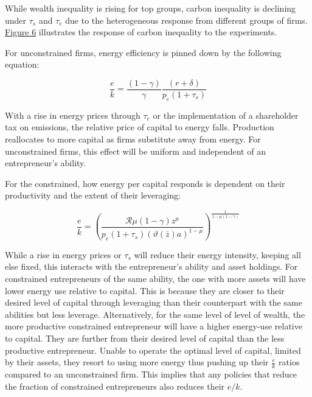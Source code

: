 \documentclass[12pt,a4paper]{article}
\begin{document}
\hspace*{6mm} While wealth inequality is rising for top groups, carbon inequality is declining under $\tau_s$ and $\tau_e$ due to the heterogeneous response from different groups of firms. \hyperref[fig:carboninequality]{Figure 6} illustrates the response of carbon inequality to the experiments. 

For unconstrained firms, energy efficiency is pinned down by the following equation:

\begin{equation}
\frac{e}{k}=\frac{(1-\gamma)}{\gamma}\frac{\left(r+\delta\right)}{p_{e}(1+\tau_s)}
\end{equation}


\hspace*{6mm} With a rise in energy prices through $\tau_e$ or the implementation of a shareholder tax on emissions, the relative price of capital to energy falls. Production reallocates to more capital as firms substitute away from energy. For unconstrained firms, this effect will be uniform and independent of an entrepreneur's ability. 

For the constrained, how energy per capital responds is dependent on their productivity and the extent of their leveraging:

\begin{equation}
\frac{e}{k}=\left(\frac{\mathcal{R}\mu(1-\gamma)z{}^{\mu}}{p_{e}(1+\tau_{s})\left(\vartheta(\bar{z})a\right)^{1-\mu}}\right)^{\frac{1}{1-\mu\left(1-\gamma\right)}} 
\end{equation}

\hspace*{6mm}  While a rise in energy prices or $\tau_s$ will reduce their energy intensity, keeping all else fixed, this interacts with the entrepreneur's ability and asset holdings. For constrained entrepreneurs of the same ability, the one with more assets will have lower energy use relative to capital. This is because they are closer to their desired level of capital through leveraging than their counterpart with the same abilities but less leverage. Alternatively, for the same level of level of wealth, the more productive constrained entrepreneur will have a higher energy-use relative to capital. They are further from their desired level of capital than the less productive entrepreneur. Unable to operate the optimal level of capital, limited by their assets, they resort to using more energy thus pushing up their $\frac{e}{k}$ ratios compared to an unconstrained firm. This implies that any policies that reduce the fraction of constrained entrepreneurs also reduces their $e/k$. 
\end{document}
